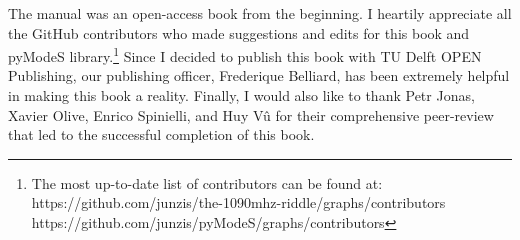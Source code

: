 {The manual was an open-access book from the beginning. I heartily appreciate all the GitHub contributors who made suggestions and edits for this book and pyModeS library.\footnote{The most up-to-date list of contributors can be found at: \\https://github.com/junzis/the-1090mhz-riddle/graphs/contributors \\https://github.com/junzis/pyModeS/graphs/contributors} Since I decided to publish this book with TU Delft OPEN Publishing, our publishing officer, Frederique Belliard, has been extremely helpful in making this book a reality. Finally, I would also like to thank Petr Jonas, Xavier Olive, Enrico Spinielli, and Huy V\^u for their comprehensive peer-review that led to the successful completion of this book.
}